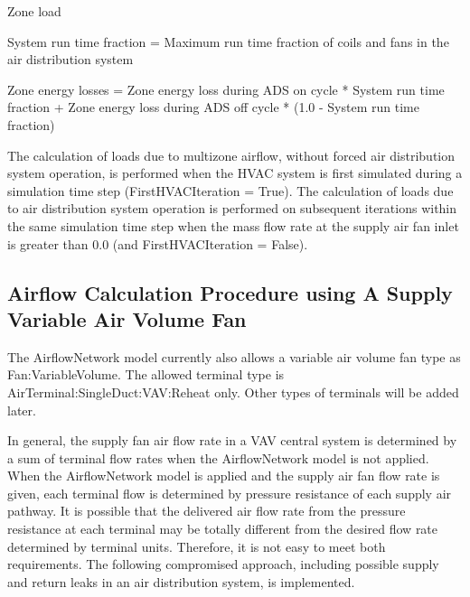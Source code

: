 Zone load

System run time fraction = Maximum run time fraction of coils and fans in the air distribution system

Zone energy losses = Zone energy loss during ADS on cycle * System run time fraction + Zone energy loss during ADS off cycle * (1.0 - System run time fraction)

The calculation of loads due to multizone airflow, without forced air distribution system operation, is performed when the HVAC system is first simulated during a simulation time step (FirstHVACIteration = True). The calculation of loads due to air distribution system operation is performed on subsequent iterations within the same simulation time step when the mass flow rate at the supply air fan inlet is greater than 0.0 (and FirstHVACIteration = False).

\subsection{Airflow Calculation Procedure using A Supply Variable Air Volume Fan}\label{airflow-calculation-procedure-using-a-supply-variable-air-volume-fan}

The AirflowNetwork model currently also allows a variable air volume fan type as Fan:VariableVolume. The allowed terminal type is AirTerminal:SingleDuct:VAV:Reheat only. Other types of terminals will be added later.

In general, the supply fan air flow rate in a VAV central system is determined by a sum of terminal flow rates when the AirflowNetwork model is not applied. When the AirflowNetwork model is applied and the supply air fan flow rate is given, each terminal flow is determined by pressure resistance of each supply air pathway. It is possible that the delivered air flow rate from the pressure resistance at each terminal may be totally different from the desired flow rate determined by terminal units. Therefore, it is not easy to meet both requirements. The following compromised approach, including possible supply and return leaks in an air distribution system, is implemented.

